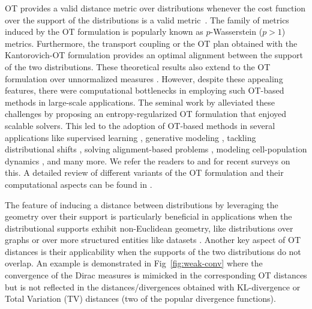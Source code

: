 OT provides a valid distance metric over distributions whenever the cost function over the support of the distributions is a valid metric~\citep{villanioldnew}. The family of metrics induced by the OT formulation is popularly known as $p$-Wasserstein ($p>1$) metrics. Furthermore, the transport coupling or the OT plan obtained with the Kantorovich-OT formulation provides an optimal alignment between the support of the two distributions. These theoretical results also extend to the OT formulation over unnormalized measures \citep{Liero2018}. However, despite these appealing features, there were computational bottlenecks in employing such OT-based methods in large-scale applications. The seminal work by \cite{cuturi13a} alleviated these challenges by proposing an entropy-regularized OT formulation that enjoyed scalable solvers. This led to the adoption of OT-based methods in several applications like supervised learning \citep{Frogner15}, generative modeling \citep{wgan17,Genevay2017LearningGM,ROT}, tackling distributional shifts \citep{Courty17domAda,courty17b,damodaran2018deepjdot,jumbot}, solving alignment-based problems \citep{alvarez18wordEmb,arase-etal-2023-unbalanced}, modeling cell-population dynamics \citep{bioapp19,TNet20,Cuturi22,cellot}, and many more. We refer the readers to \cite{khamis24OT} and \cite{Torres21} for recent surveys on this. A detailed review of different variants of the OT formulation and their computational aspects can be found in \cite{peyre2019computational}.

The feature of inducing a distance between distributions by leveraging the geometry over their support is particularly beneficial in applications when the distributional supports exhibit non-Euclidean geometry, like distributions over graphs \citep{GOT} or over more structured entities like datasets \citep{alvarezmelis2020geometricdatasetdistancesoptimal}. Another key aspect of OT distances is their applicability when the supports of the two distributions do not overlap. An example is demonstrated in Fig~\ref{fig:weak-conv} where the convergence of the Dirac measures is mimicked in the corresponding OT distances but is not reflected in the distances/divergences obtained with KL-divergence or Total Variation (TV) distances (two of the popular divergence functions).


